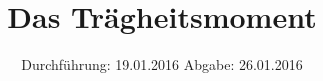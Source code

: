 

\subject{V101}
\title{Das Trägheitsmoment}
\date{
  Durchführung: 19.01.2016
  \hspace{3em}
  Abgabe: 26.01.2016
}



\maketitle
\thispagestyle{empty}
\tableofcontents
\newpage








\printbibliography


